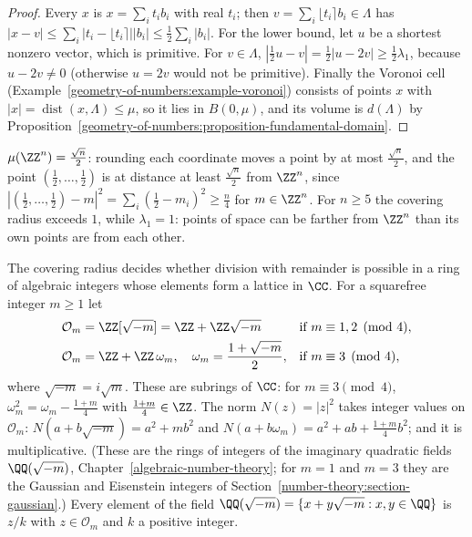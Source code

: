 \begin{proof}
Every $x$ is $x = \sum_it_ib_i$ with real $t_i$; then $v = \sum_i\lfloor t_i\rceil b_i \in \Lambda$ has $|x - v| \leq \sum_i|t_i - \lfloor t_i\rceil||b_i| \leq \frac12\sum_i|b_i|$. For the lower bound, let $u$ be a
shortest nonzero vector, which is primitive. For $v \in \Lambda$, $|\frac12u - v| = \frac12|u - 2v| \geq \frac12\lambda_1$, because $u - 2v \neq 0$ (otherwise $u = 2v$ would not be primitive). Finally the
Voronoi cell (Example~\ref{geometry-of-numbers:example-voronoi}) consists of points $x$ with $|x| = \operatorname{dist}(x, \Lambda) \leq \mu$, so it lies in $B(0, \mu)$, and its volume is $d(\Lambda)$ by
Proposition~\ref{geometry-of-numbers:proposition-fundamental-domain}.
\end{proof}

\begin{example}\label{geometry-of-numbers:example-covering-zn}
$\mu(\ZZ^n) = \frac{\sqrt n}{2}$: rounding each coordinate moves a point by at most $\frac{\sqrt n}{2}$, and the point $(\frac12, \ldots, \frac12)$ is at distance at least $\frac{\sqrt n}{2}$ from
$\ZZ^n$, since $|(\frac12, \ldots, \frac12) - m|^2 = \sum_i(\frac12 - m_i)^2 \geq \frac n4$ for $m \in \ZZ^n$. For $n \geq 5$ the covering radius exceeds $1$,
while $\lambda_1 = 1$: points of space can be farther from $\ZZ^n$ than its own points are from each other.
\end{example}

The covering radius decides whether division with remainder is possible in a ring of algebraic integers whose elements form a lattice in $\CC$. For a squarefree integer $m \geq 1$ let
\[
\begin{aligned}
\mathcal{O}_m &= \ZZ[\sqrt{-m}] = \ZZ + \ZZ\sqrt{-m} &&\text{if } m \equiv 1, 2 \pmod 4,\\
\mathcal{O}_m &= \ZZ + \ZZ\,\omega_m, \quad \omega_m = \frac{1 + \sqrt{-m}}{2}, &&\text{if } m \equiv 3 \pmod 4,
\end{aligned}
\]
where $\sqrt{-m} = i\sqrt m$. These are subrings of $\CC$: for $m \equiv 3 \pmod 4$, $\omega_m^2 = \omega_m - \frac{1 + m}{4}$ with $\frac{1 + m}{4} \in \ZZ$. The norm $N(z) = |z|^2$ takes integer values on
$\mathcal{O}_m$: $N(a + b\sqrt{-m}) = a^2 + mb^2$ and $N(a + b\omega_m) = a^2 + ab + \frac{1 + m}{4}b^2$; and it is multiplicative. (These are the rings of integers of the imaginary quadratic fields
$\QQ(\sqrt{-m})$, Chapter~\ref{algebraic-number-theory}; for $m = 1$ and $m = 3$ they are the Gaussian and Eisenstein integers of Section~\ref{number-theory:section-gaussian}.) Every element of the field
$\QQ(\sqrt{-m}) = \{x + y\sqrt{-m} : x, y \in \QQ\}$ is $z/k$ with $z \in \mathcal{O}_m$ and $k$ a positive integer.

